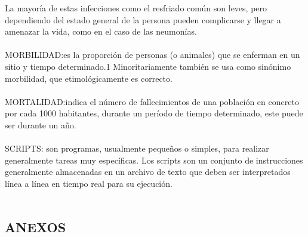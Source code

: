 \documentclass[a4paper,openright,12pt]{book}
\theoremstyle{definition}
\theoremstyle{remark}
\begin{document}
La mayoría de estas infecciones como el resfriado común son leves, pero dependiendo del estado general de la persona pueden complicarse y llegar a amenazar la vida, como en el caso de las neumonías. \\\\
MORBILIDAD:es la proporción de personas (o animales) que se enferman en un sitio y tiempo determinado.1 Minoritariamente también se usa como sinónimo morbilidad, que etimológicamente es correcto.  \\\\
MORTALIDAD:indica el número de fallecimientos de una población en concreto por cada 1000 habitantes, durante un período de tiempo determinado, este puede ser durante un año. \\\\
SCRIPTS: son programas, usualmente pequeños o simples, para realizar generalmente tareas muy específicas. Los scripts son un conjunto de instrucciones generalmente almacenadas en un archivo de texto que deben ser interpretados línea a línea en tiempo real para su ejecución.\\\\
\clearpage

\begin{center}
 \chapter{ANEXOS}\label{cap.anexos}
\end{center}
\end{document}
